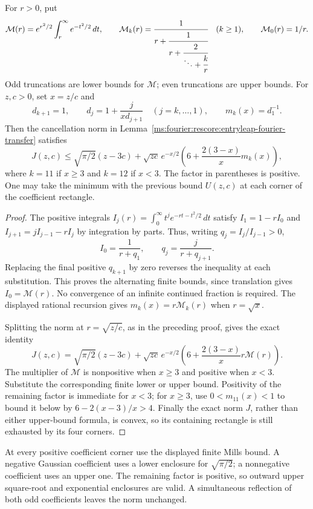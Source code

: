 \begin{lemma}\label{ms:fourier:rescore:entry189-mills}
For $r>0$, put
\[
 \mathcal M(r)=e^{r^2/2}\int_r^\infty e^{-t^2/2}\,dt,
 \qquad
 \mathcal M_k(r)=\cfrac1{r+\cfrac1{r+\cfrac2{\ddots+\cfrac{k}{r}}}}
 \quad(k\ge1),\qquad \mathcal M_0(r)=1/r.
\]
Odd truncations are lower bounds for $\mathcal M$; even truncations
are upper bounds. For $z,c>0$, set $x=z/c$ and
\[
 d_{k+1}=1,\qquad d_j=1+\frac j{xd_{j+1}}\quad(j=k,\ldots,1),
 \qquad m_k(x)=d_1^{-1}.
\]
Then the cancellation norm in Lemma~\ref{ms:fourier:rescore:entryleap-fourier-transfer}
satisfies
\begin{equation}\label{ms:fourier:rescore:entry189-mills-bound}
 J(z,c)\le \sqrt{\pi/2}(z-3c)+\sqrt{zc}\,e^{-x/2}
 \left(6+\frac{2(3-x)}x m_k(x)\right),
\end{equation}
where $k=11$ if $x\ge3$ and $k=12$ if $x<3$.
The factor in parentheses is positive. One may take the minimum with
the previous bound $U(z,c)$ at each corner of the coefficient rectangle.
\end{lemma}
\begin{proof}
The positive integrals
$I_j(r)=\int_0^\infty t^j e^{-rt-t^2/2}\,dt$ satisfy
$I_1=1-rI_0$ and $I_{j+1}=jI_{j-1}-rI_j$ by integration by parts.
Thus, writing $q_j=I_j/I_{j-1}>0$,
\[
 I_0=\frac1{r+q_1},\qquad q_j=\frac j{r+q_{j+1}}.
\]
Replacing the final positive $q_{k+1}$ by zero reverses the inequality
at each substitution. This proves the alternating finite bounds, since
translation gives $I_0=\mathcal M(r)$. No convergence of an infinite
continued fraction is required. The displayed rational recursion gives
$m_k(x)=r\mathcal M_k(r)$ when $r=\sqrt x$.

Splitting the norm at $r=\sqrt{z/c}$, as in the preceding proof, gives
the exact identity
\[
 J(z,c)=\sqrt{\pi/2}(z-3c)+\sqrt{zc}\,e^{-x/2}
 \left(6+\frac{2(3-x)}x r\mathcal M(r)\right).
\]
The multiplier of $\mathcal M$ is nonpositive when $x\ge3$ and
positive when $x<3$. Substitute the corresponding finite lower or
upper bound. Positivity of the remaining factor is immediate for
$x<3$; for $x\ge3$, use $0<m_{11}(x)<1$ to bound it below by
$6-2(x-3)/x>4$. Finally the exact norm $J$, rather than either
upper-bound formula, is convex, so its containing rectangle is still
exhausted by its four corners.
\end{proof}

At every positive coefficient corner use the displayed finite Mills bound.
A negative Gaussian coefficient uses a lower enclosure for
$\sqrt{\pi/2}$; a nonnegative coefficient uses an upper one. The remaining
factor is positive, so outward upper square-root and exponential enclosures
are valid. A simultaneous reflection of both odd coefficients leaves the
norm unchanged.


